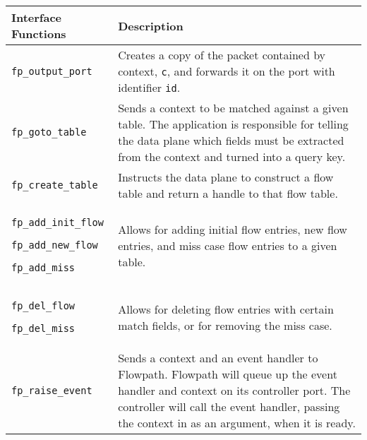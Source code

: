 \begin{table}
\begin{center}
\begin{tabular}{| p{0.3\linewidth} | p{0.7\linewidth} |}
\hline
Interface Functions & Description \\

\hline
\texttt{fp\_output\_port} & 

Creates a copy of the packet contained by context, \texttt{c}, and forwards it on the port with identifier \texttt{id}. \\
\hline 

\texttt{fp\_goto\_table} & 
Sends a context to be matched against a given table. The application is responsible for telling the data plane which fields must be extracted from the context and turned into a query key. \\

\hline

\texttt{fp\_create\_table} &
Instructs the data plane to construct a flow table and return a handle to that flow table. \\
\hline


\texttt{fp\_add\_init\_flow}

\texttt{fp\_add\_new\_flow} 

\texttt{fp\_add\_miss}

&

Allows for adding initial flow entries, new flow entries, and miss case flow entries to a given table. \\
\hline

\texttt{fp\_del\_flow}

\texttt{fp\_del\_miss} &

Allows for deleting flow entries with certain match fields, or for removing the miss case. \\

\hline


\texttt{fp\_raise\_event} &

Sends a context and an event handler to Flowpath. Flowpath will queue up the event handler and context on its controller port. The controller will call the event handler, passing the context in as an argument, when it is ready. \\
\hline


\end{tabular}
\end{center}
\end{table}
